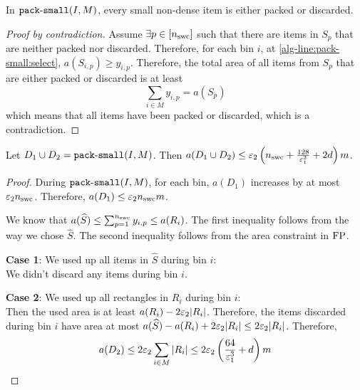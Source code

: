 \begin{lemma}
In $\operatorname{\mathtt{pack-small}}(I, M)$, every small non-dense item is either packed or discarded.
\end{lemma}
\begin{proof}[Proof by contradiction]
Assume $\exists p \in [n_{\mathrm{swc}}]$ such that there are items in $S_p$
that are neither packed nor discarded.
Therefore, for each bin $i$, at \cref{alg-line:pack-small:select},
$a(S_{i,p}) \ge y_{i,p}$. Therefore, the total area of all items from $S_p$
that are either packed or discarded is at least
\[ \sum_{i \in M} y_{i,p} = a(S_p)  \tag{by conservation constraint in $\FP$} \]
which means that all items have been packed or discarded, which is a contradiction.
\end{proof}

\begin{lemma}
Let $D_1 \cup D_2 = \operatorname{\mathtt{pack-small}}(I, M)$. Then
$a(D_1 \cup D_2) \le \varepsilon_2\left(n_{\mathrm{swc}} + \frac{128}{\varepsilon_1^3} + 2d\right) m$.
\end{lemma}
\begin{proof}
During $\operatorname{\mathtt{pack-small}}(I, M)$, for each bin, $a(D_1)$ increases by at most $\varepsilon_2 n_{\mathrm{swc}}$.
Therefore, $a(D_1) \le \varepsilon_2 n_{\mathrm{swc}} m$.

We know that $a(\widehat{S}) \le \sum_{p=1}^{n_{\mathrm{swc}}} y_{i,p} \le a(R_i)$.
The first inequality follows from the way we chose $\widehat{S}$.
The second inequality follows from the area constraint in $\operatorname{FP}$.

\textbf{Case 1}: We used up all items in $\widehat{S}$ during bin $i$:\\
We didn't discard any items during bin $i$.

\textbf{Case 2}: We used up all rectangles in $R_i$ during bin $i$:\\
Then the used area is at least $a(R_i) - 2\varepsilon_2|R_i|$.
Therefore, the items discarded during bin $i$ have area at most
$a(\widehat{S}) - a(R_i) + 2\varepsilon_2|R_i| \le 2\varepsilon_2|R_i|$.
Therefore,
\[ a(D_2) \le 2\varepsilon_2\sum_{i \in M}|R_i|
\le 2\varepsilon_2\left(\frac{64}{\varepsilon_1^3} + d\right) m \qedhere \]
\end{proof}

